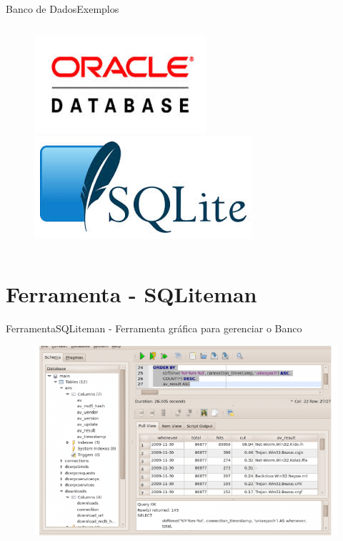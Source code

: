 \documentclass{beamer}
\begin{document}
\begin{frame}[fragile]{Banco de Dados}{Exemplos}
\begin{columns}
		\begin{column}{0.5\textwidth}
			\begin{figure}
				\begin{minipage}{\columnwidth}
					\includegraphics[scale=0.7]{images/oracle}
				\end{minipage}
				\begin{minipage}{\columnwidth}
					\includegraphics[scale=0.5]{images/sqlite}
				\end{minipage}
			\end{figure}
		\end{column}
	\end{columns}		
\end{frame}

\section{Ferramenta - SQLiteman}
\begin{frame}[fragile]{Ferramenta}{SQLiteman - Ferramenta gráfica para gerenciar o Banco}
	\begin{figure}
		\begin{minipage}{\columnwidth}
			\centering
				\includegraphics[scale=0.4]{images/sqliteman}
		\end{minipage}
	\end{figure}
\end{frame}
\end{document}
